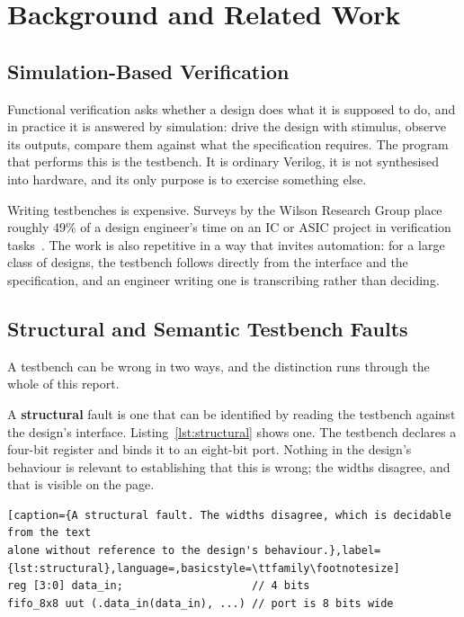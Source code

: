 \documentclass[11pt,a4paper,titlepage=false]{scrreprt}
\begin{document}
\chapter{Background and Related Work}\label{ch:background}

\section{Simulation-Based Verification}\label{sec:bg-verification}

Functional verification asks whether a design does what it is supposed to do, and in
practice it is answered by simulation: drive the design with stimulus, observe its outputs,
compare them against what the specification requires. The program that performs this is the
testbench. It is ordinary Verilog, it is not synthesised into hardware, and its only purpose
is to exercise something else.

Writing testbenches is expensive. Surveys by the Wilson Research Group place roughly 49\% of
a design engineer's time on an IC or ASIC project in verification tasks~\cite{wilson2022}.
The work is also repetitive in a way that invites automation: for a large class of designs,
the testbench follows directly from the interface and the specification, and an engineer
writing one is transcribing rather than deciding.

\section{Structural and Semantic Testbench Faults}\label{sec:bg-fault-classes}

A testbench can be wrong in two ways, and the distinction runs through the whole of this
report.

A \textbf{structural} fault is one that can be identified by reading the testbench against
the design's interface. Listing~\ref{lst:structural} shows one. The testbench declares a
four-bit register and binds it to an eight-bit port. Nothing in the design's behaviour is
relevant to establishing that this is wrong; the widths disagree, and that is visible on the
page.

\begin{lstlisting}[caption={A structural fault. The widths disagree, which is decidable from the text
alone without reference to the design's behaviour.},label={lst:structural},language=,basicstyle=\ttfamily\footnotesize]
reg [3:0] data_in;                    // 4 bits
fifo_8x8 uut (.data_in(data_in), ...) // port is 8 bits wide
\end{lstlisting}
\end{document}
